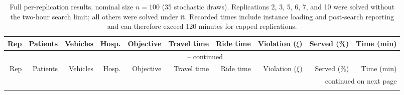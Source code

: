 \begingroup
\footnotesize
\setlength{\tabcolsep}{3pt}
\renewcommand{\arraystretch}{0.90}

\begin{longtable}{rrrrrrrrrr}
\caption{Full per-replication results, nominal size $n=100$ (35 stochastic draws). Replications 2, 3, 5, 6, 7, and 10 were solved without the two-hour search limit; all others were solved under it. Recorded times include instance loading and post-search reporting and can therefore exceed 120 minutes for capped replications.}
\label{tab:full-100} \\
\toprule
Rep & Patients & Vehicles & Hosp. & Objective & Travel time & Ride time & Violation ($\xi$) & Served (\%) & Time (min) \\
\midrule
\endfirsthead

\multicolumn{10}{c}{\tablename\ \thetable{} -- continued} \\
\toprule
Rep & Patients & Vehicles & Hosp. & Objective & Travel time & Ride time & Violation ($\xi$) & Served (\%) & Time (min) \\
\midrule
\endhead

\midrule
\multicolumn{10}{r}{continued on next page} \\
\endfoot

\bottomrule
\endlastfoot


\end{longtable}
